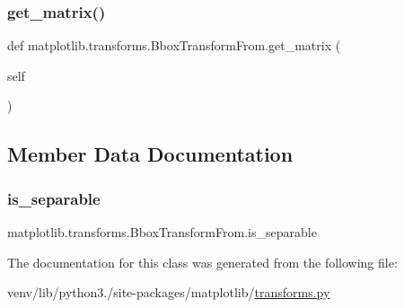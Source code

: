 \subsubsection{\texorpdfstring{get\+\_\+matrix()}{get\_matrix()}}
{\footnotesize\ttfamily def matplotlib.\+transforms.\+Bbox\+Transform\+From.\+get\+\_\+matrix (\begin{DoxyParamCaption}\item[{}]{self }\end{DoxyParamCaption})}



\subsection{Member Data Documentation}
\mbox{\label{classmatplotlib_1_1transforms_1_1BboxTransformFrom_abe8550e9a5421caf20f65420d694f178}} 
\subsubsection{\texorpdfstring{is\+\_\+separable}{is\_separable}}
{\footnotesize\ttfamily matplotlib.\+transforms.\+Bbox\+Transform\+From.\+is\+\_\+separable\hspace{0.3cm}{\ttfamily [static]}}



The documentation for this class was generated from the following file\+:\begin{DoxyCompactItemize}
\item 
venv/lib/python3./site-\/packages/matplotlib/\hyperlink{transforms_8py}{transforms.\+py}\end{DoxyCompactItemize}
